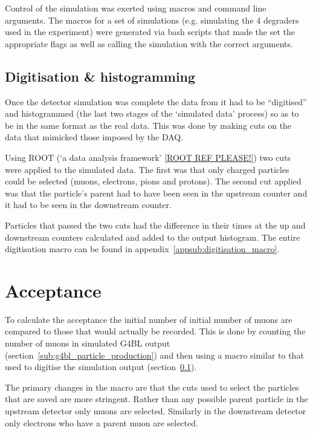 \documentclass[]{article}
\begin{document}
Control of the simulation was exerted using macros and command line arguments. The macros for a set of simulations (e.g. simulating the 4 degraders used in the experiment) were generated via bash scripts that made the set the appropriate flags as well as calling the simulation with the correct arguments.
\subsection{Digitisation \& histogramming} %
\label{sub:digitisation_histogramming}
Once the detector simulation was complete the data from it had to be ``digitised'' and histogrammed (the last two stages of the `simulated data' process) so as to be in the same format as the real data. This was done by making cuts on the data that mimicked those imposed by the DAQ. 

Using ROOT (`a data analysis framework' \ref{ROOT REF PLEASE!}) two cuts were applied to the simulated data. The first was that only charged particles could be selected (muons, electrons, pions and protons). The second cut applied was that the particle's parent had to have been seen in the upstream counter and it had to be seen in the downstream counter. 

Particles that passed the two cuts had the difference in their times at the up and downstream counters calculated and added to the output histogram. The entire digitisation macro can be found in appendix~\ref{appsub:digitisation_macro}.
\section{Acceptance} %
\label{sec:acceptance}
To calculate the acceptance the initial number of initial number of muons are compared to those that would actually be recorded. This is done by counting the number of muons in simulated G4BL output (section~\ref{sub:g4bl_particle_production}) and then using a macro similar to that used to digitise the simulation output (section~\ref{sub:digitisation_histogramming}).

The primary changes in the macro are that the cuts used to select the particles that are saved are more stringent. Rather than any possible parent particle in the upstream detector only muons are selected. Similarly in the downstream detector only electrons who have a parent muon are selected.
\end{document}
